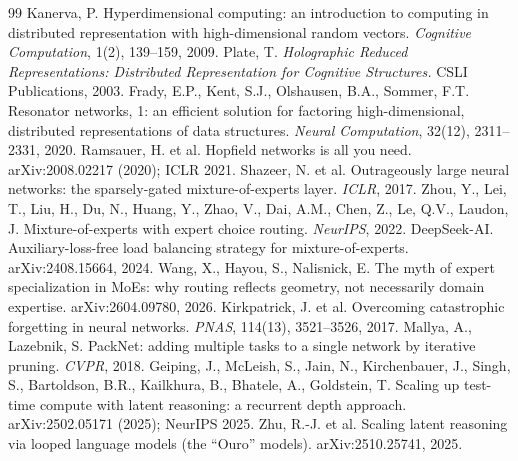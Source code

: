 \documentclass[11pt,letterpaper]{article}
\begin{document}
\begin{thebibliography}{99}
 Kanerva, P. Hyperdimensional computing: an introduction to computing in distributed representation with high-dimensional random vectors. \emph{Cognitive Computation}, 1(2), 139--159, 2009.
 Plate, T. \emph{Holographic Reduced Representations: Distributed Representation for Cognitive Structures.} CSLI Publications, 2003.
 Frady, E.P., Kent, S.J., Olshausen, B.A., Sommer, F.T. Resonator networks, 1: an efficient solution for factoring high-dimensional, distributed representations of data structures. \emph{Neural Computation}, 32(12), 2311--2331, 2020.
 Ramsauer, H. et al. Hopfield networks is all you need. arXiv:2008.02217 (2020); ICLR 2021.
 Shazeer, N. et al. Outrageously large neural networks: the sparsely-gated mixture-of-experts layer. \emph{ICLR}, 2017.
 Zhou, Y., Lei, T., Liu, H., Du, N., Huang, Y., Zhao, V., Dai, A.M., Chen, Z., Le, Q.V., Laudon, J. Mixture-of-experts with expert choice routing. \emph{NeurIPS}, 2022.
 DeepSeek-AI. Auxiliary-loss-free load balancing strategy for mixture-of-experts. arXiv:2408.15664, 2024.
 Wang, X., Hayou, S., Nalisnick, E. The myth of expert specialization in MoEs: why routing reflects geometry, not necessarily domain expertise. arXiv:2604.09780, 2026.
 Kirkpatrick, J. et al. Overcoming catastrophic forgetting in neural networks. \emph{PNAS}, 114(13), 3521--3526, 2017.
 Mallya, A., Lazebnik, S. PackNet: adding multiple tasks to a single network by iterative pruning. \emph{CVPR}, 2018.
 Geiping, J., McLeish, S., Jain, N., Kirchenbauer, J., Singh, S., Bartoldson, B.R., Kailkhura, B., Bhatele, A., Goldstein, T. Scaling up test-time compute with latent reasoning: a recurrent depth approach. arXiv:2502.05171 (2025); NeurIPS 2025.
 Zhu, R.-J. et al. Scaling latent reasoning via looped language models (the ``Ouro'' models). arXiv:2510.25741, 2025.
\end{thebibliography}
\end{document}
